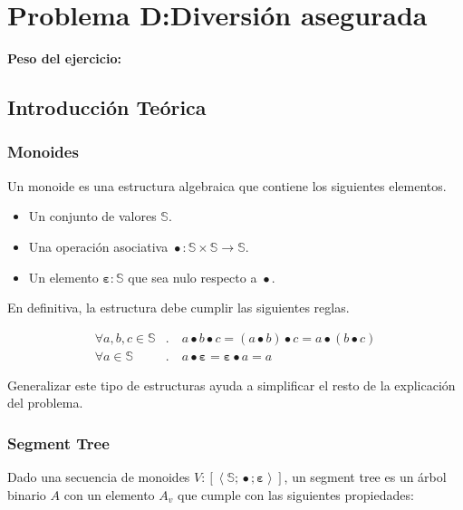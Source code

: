 \newpage{}
\section{Problema D:\@ Diversión asegurada}
\textbf{Peso del ejercicio: }

\newcommand{\mappend}{\operatorname{\bullet}}
\newcommand{\mempty}{\mathbf{\varepsilon}}
\newcommand{\sizeV}{\left|V\right|}

\subsection{Introducción Teórica}

\subsubsection{Monoides}

Un monoide es una estructura algebraica que contiene los siguientes elementos.

\begin{itemize}
	\item Un conjunto de valores \(\mathbb{S}\).
	\item Una operación asociativa \(\mappend : \mathbb{S} \times \mathbb{S} \rightarrow \mathbb{S}\).
	\item Un elemento \(\mempty : \mathbb{S}\) que sea nulo respecto a \(\mappend\).
\end{itemize}

En definitiva, la estructura debe cumplir las siguientes reglas.

\[
\begin{aligned}
	\forall a, b, c \in \mathbb{S}&. \quad a \mappend b \mappend c = (a \mappend b) \mappend c = a \mappend (b \mappend c) \\
	\forall a \in \mathbb{S}&. \quad a \mappend \mempty = \mempty \mappend a = a
\end{aligned}
\]

Generalizar este tipo de estructuras ayuda a simplificar el resto de la explicación del problema.

\subsubsection{Segment Tree}

Dado una secuencia de monoides \(V : \left[\left<\mathbb{S}; \mappend; \mempty\right>\right]\), un segment tree es un árbol binario \(A\) con un elemento \(A_v\) que cumple con las siguientes propiedades:

